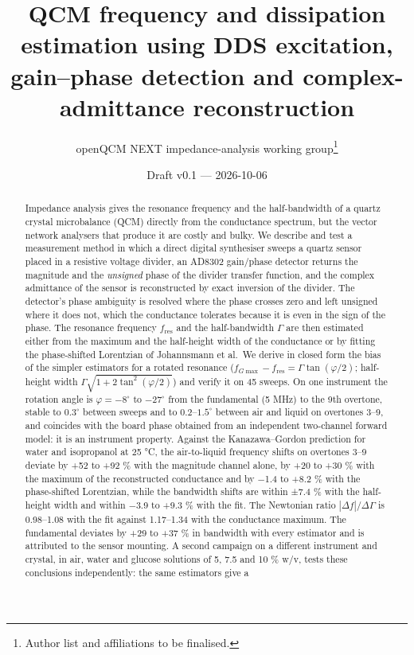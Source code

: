 \documentclass[11pt,a4paper]{article}
\title{QCM frequency and dissipation estimation using DDS excitation, gain--phase detection and complex-admittance reconstruction}
\author{openQCM NEXT impedance-analysis working group\thanks{Author list and affiliations to be finalised.}}
\date{Draft v0.1 --- 2026-10-06}
\begin{document}
\maketitle
\begin{abstract}
Impedance analysis gives the resonance frequency and the half-bandwidth
of a quartz crystal microbalance (QCM) directly from the conductance
spectrum, but the vector network analysers that produce it are costly
and bulky. We describe and test a measurement method in which a direct
digital synthesiser sweeps a quartz sensor placed in a resistive voltage
divider, an AD8302 gain/phase detector returns the magnitude and the
\emph{unsigned} phase of the divider transfer function, and the complex
admittance of the sensor is reconstructed by exact inversion of the
divider. The detector's phase ambiguity is resolved where the phase
crosses zero and left unsigned where it does not, which the conductance
tolerates because it is even in the sign of the phase. The resonance
frequency \(f_\mathrm{res}\) and the half-bandwidth \(\Gamma\) are then
estimated either from the maximum and the half-height width of the
conductance or by fitting the phase-shifted Lorentzian of Johannsmann et
al.~We derive in closed form the bias of the simpler estimators for a
rotated resonance
(\(f_{G\max} - f_\mathrm{res} = \Gamma\tan(\varphi/2)\); half-height
width \(\Gamma\sqrt{1+2\tan^2(\varphi/2)}\)) and verify it on 45 sweeps.
On one instrument the rotation angle is \(\varphi = -8^\circ\) to
\(-27^\circ\) from the fundamental (5 MHz) to the 9th overtone, stable
to \(0.3^\circ\) between sweeps and to \(0.2\)--\(1.5^\circ\) between
air and liquid on overtones 3--9, and coincides with the board phase
obtained from an independent two-channel forward model: it is an
instrument property. Against the Kanazawa--Gordon prediction for water
and isopropanol at 25 °C, the air-to-liquid frequency shifts on
overtones 3--9 deviate by +52 to +92 \% with the magnitude channel
alone, by +20 to +30 \% with the maximum of the reconstructed
conductance and by −1.4 to +8.2 \% with the phase-shifted Lorentzian,
while the bandwidth shifts are within ±7.4 \% with the half-height width
and within −3.9 to +9.3 \% with the fit. The Newtonian ratio
\(|\Delta f|/\Delta\Gamma\) is 0.98--1.08 with the fit against
1.17--1.34 with the conductance maximum. The fundamental deviates by +29
to +37 \% in bandwidth with every estimator and is attributed to the
sensor mounting. A second campaign on a different instrument and
crystal, in air, water and glucose solutions of 5, 7.5 and 10 \% w/v,
tests these conclusions independently: the same estimators give a

\end{abstract}
\end{document}

